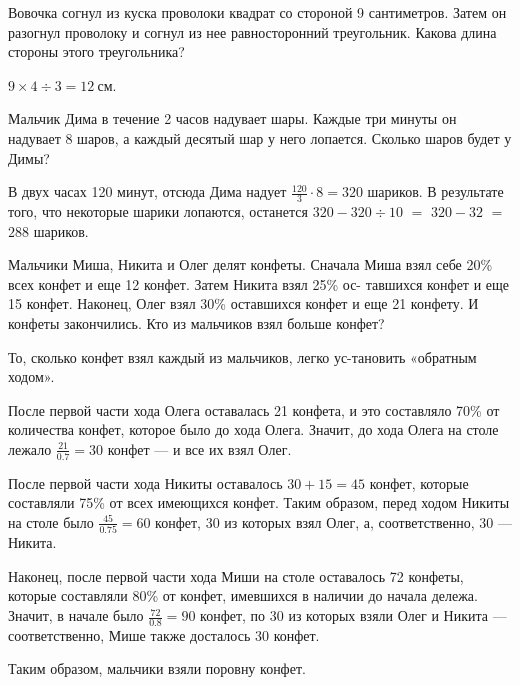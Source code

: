 ﻿


\begin{itemize}

	\itA Вовочка согнул из куска проволоки квадрат со стороной 9 сантиметров. Затем он разогнул проволоку и согнул из нее равносторонний треугольник. Какова длина стороны этого треугольника?

	\itr $9 \times 4 \div 3 = \SI{12}{\text{см}}$.

	\itB Мальчик Дима в течение 2 часов надувает шары. Каждые три минуты он надувает 8 шаров, а каждый десятый шар у него лопается. Сколько шаров будет у Димы?
	
	\itr В двух часах 120 минут, отсюда Дима надует $\tfrac{120}{3} \cdot 8 = 320$ шариков. В результате того, что некоторые шарики лопаются, останется $320 - 320 \div 10$ $=$ $320 - 32$ $=$ $288$ шариков.
	
	\itC Мальчики Миша, Никита и Олег делят конфеты. Сначала Миша взял себе 20\% всех конфет и еще 12 конфет. Затем Никита взял 25\% ос- тавшихся конфет и еще 15 конфет. Наконец, Олег взял 30\% оставшихся конфет и еще 21 конфету. И конфеты закончились. Кто из мальчиков взял больше конфет?
	
	\itr То, сколько конфет взял каждый из мальчиков, легко ус-\linebreak тановить «обратным ходом».
	
	После первой части хода Олега оставалась 21 конфета, и это составляло 70\% от количества конфет, которое было до хода Олега. Значит, до хода Олега на столе лежало $\tfrac{21}{0.7} = 30$ конфет — и все их взял Олег.
	
	После первой части хода Никиты оставалось $30+15=45$ конфет, которые составляли 75\% от всех имеющихся конфет. Таким образом, перед ходом Никиты на столе было $\tfrac{45}{0.75}=60$ конфет, 30 из которых взял Олег, а, соответственно, 30 — Никита.
	
	Наконец, после первой части хода Миши на столе оставалось 72 \linebreak конфеты, которые составляли 80\% от конфет, имевшихся в наличии до начала дележа. Значит, в начале было $\tfrac{72}{0.8} = 90$ конфет, по 30 из которых взяли Олег и Никита — соответственно, Мише также досталось 30 конфет.
	
	Таким образом, мальчики взяли поровну конфет.

\end{itemize}


